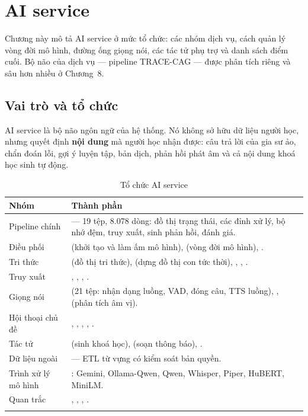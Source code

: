 \chapter{AI service}

Chương này mô tả AI service ở mức tổ chức: các nhóm dịch vụ, cách quản lý vòng đời mô hình, đường ống giọng nói, các tác tử phụ trợ và danh sách điểm cuối. Bộ não của dịch vụ — pipeline TRACE-CAG — được phân tích riêng và sâu hơn nhiều ở Chương~8.

\section{Vai trò và tổ chức}

AI service là bộ não ngôn ngữ của hệ thống. Nó không sở hữu dữ liệu người học, nhưng
quyết định \textbf{nội dung} mà người học nhận được: câu trả lời của gia sư ảo, chẩn đoán
lỗi, gợi ý luyện tập, bản dịch, phản hồi phát âm và cả nội dung khoá học sinh tự động.

\begin{longtable}{L{4.4cm} L{9.2cm}}
\toprule
\textbf{Nhóm} & \textbf{Thành phần}\\
\midrule
\endhead
Pipeline chính &  — 19 tệp, 8.078 dòng: đồ thị trạng thái, các đỉnh xử lý, bộ nhớ đệm, truy xuất, sinh phản hồi, đánh giá.\\
Điều phối &  (khởi tạo và làm ấm mô hình),  (vòng đời mô hình), .\\
Tri thức &  (đồ thị tri thức),  (dựng đồ thị con tức thời), , , .\\
Truy xuất & , , , .\\
Giọng nói &  (21 tệp: nhận dạng luồng, VAD, đóng câu, TTS luồng), ,  (phân tích âm vị).\\
Hội thoại chủ đề & , , , , .\\
Tác tử &  (sinh khoá học),  (soạn thông báo), .\\
Dữ liệu ngoài &  — ETL từ vựng có kiểm soát bản quyền.\\
Trình xử lý mô hình & : Gemini, Ollama-Qwen, Qwen, Whisper, Piper, HuBERT, MiniLM.\\
Quan trắc & , , , .\\
\bottomrule
\caption{Tổ chức AI service}
\end{longtable}

